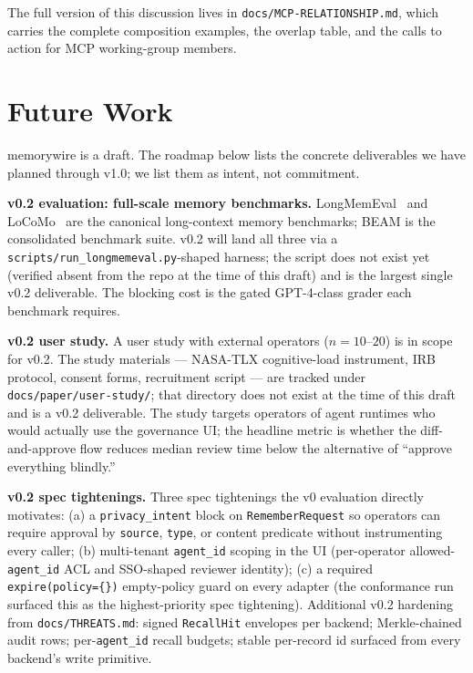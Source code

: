 \documentclass[11pt,letterpaper,twocolumn]{article}
\begin{document}
The full version of this discussion lives in \texttt{docs/MCP-RELATIONSHIP.md}, which carries the complete composition examples, the overlap table, and the calls to action for MCP working-group members.

\section{Future Work}
\label{sec:future}

memorywire is a draft. The roadmap below lists the concrete deliverables we have planned through v1.0; we list them as intent, not commitment.

\textbf{v0.2 evaluation: full-scale memory benchmarks.} LongMemEval~\cite{wu2024longmemeval} and LoCoMo~\cite{maharana2024locomo} are the canonical long-context memory benchmarks; BEAM is the consolidated benchmark suite. v0.2 will land all three via a \texttt{scripts/run\_longmemeval.py}-shaped harness; the script does not exist yet (verified absent from the repo at the time of this draft) and is the largest single v0.2 deliverable. The blocking cost is the gated GPT-4-class grader each benchmark requires.

\textbf{v0.2 user study.} A user study with external operators ($n=10$--$20$) is in scope for v0.2. The study materials --- NASA-TLX cognitive-load instrument, IRB protocol, consent forms, recruitment script --- are tracked under \texttt{docs/paper/user-study/}; that directory does not exist at the time of this draft and is a v0.2 deliverable. The study targets operators of agent runtimes who would actually use the governance UI; the headline metric is whether the diff-and-approve flow reduces median review time below the alternative of ``approve everything blindly.''

\textbf{v0.2 spec tightenings.} Three spec tightenings the v0 evaluation directly motivates: (a) a \texttt{privacy\_intent} block on \texttt{RememberRequest} so operators can require approval by \texttt{source}, \texttt{type}, or content predicate without instrumenting every caller; (b) multi-tenant \texttt{agent\_id} scoping in the UI (per-operator allowed-\texttt{agent\_id} ACL and SSO-shaped reviewer identity); (c) a required \texttt{expire(policy=\{\})} empty-policy guard on every adapter (the  conformance run surfaced this as the highest-priority spec tightening). Additional v0.2 hardening from \texttt{docs/THREATS.md}: signed \texttt{RecallHit} envelopes per backend; Merkle-chained audit rows; per-\texttt{agent\_id} recall budgets; stable per-record id surfaced from every backend's write primitive.
\end{document}
